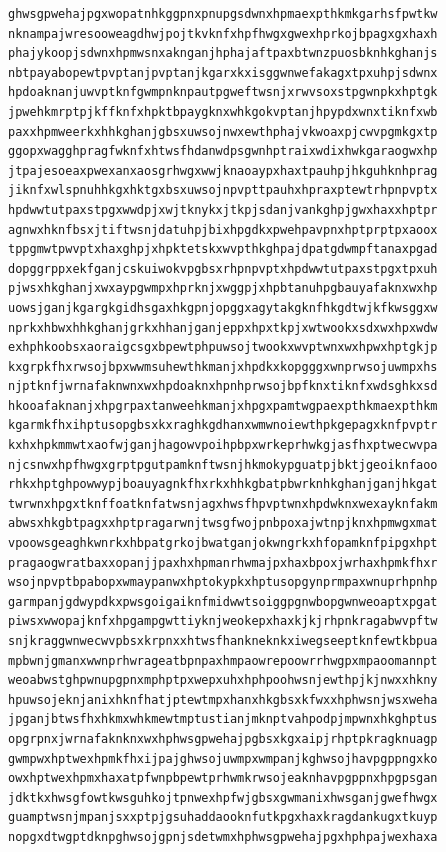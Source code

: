\documentclass[11pt,letterpaper]{exam}
\begin{document}
\begin{questions}
\begin{verbatim}
ghwsgpwehajpgxwopatnhkggpnxpnupgsdwnxhpmaexpthkmkgarhsfpwtkw
nknampajwresooweagdhwjpojtkvknfxhpfhwgxgwexhprkojbpagxgxhaxh
phajykoopjsdwnxhpmwsnxaknganjhphajaftpaxbtwnzpuosbknhkghanjs
nbtpayabopewtpvptanjpvptanjkgarxkxisggwnwefakagxtpxuhpjsdwnx
hpdoaknanjuwvptknfgwmpnknpautpgweftwsnjxrwvsoxstpgwnpkxhptgk
jpwehkmrptpjkffknfxhpktbpaygknxwhkgokvptanjhpypdxwnxtiknfxwb
paxxhpmweerkxhhkghanjgbsxuwsojnwxewthphajvkwoaxpjcwvpgmkgxtp
ggopxwagghpragfwknfxhtwsfhdanwdpsgwnhptraixwdixhwkgaraogwxhp
jtpajesoeaxpwexanxaosgrhwgxwwjknaoaypxhaxtpauhpjhkguhknhprag
jiknfxwlspnuhhkgxhktgxbsxuwsojnpvpttpauhxhpraxptewtrhpnpvptx
hpdwwtutpaxstpgxwwdpjxwjtknykxjtkpjsdanjvankghpjgwxhaxxhptpr
agnwxhknfbsxjtiftwsnjdatuhpjbixhpgdkxpwehpavpnxhptprptpxaoox
tppgmwtpwvptxhaxghpjxhpktetskxwvpthkghpajdpatgdwmpftanaxpgad
dopggrppxekfganjcskuiwokvpgbsxrhpnpvptxhpdwwtutpaxstpgxtpxuh
pjwsxhkghanjxwxaypgwmpxhprknjxwggpjxhpbtanuhpgbauyafaknxwxhp
uowsjganjkgargkgidhsgaxhkgpnjopggxagytakgknfhkgdtwjkfkwsggxw
nprkxhbwxhhkghanjgrkxhhanjganjeppxhpxtkpjxwtwookxsdxwxhpxwdw
exhphkoobsxaoraigcsgxbpewtphpuwsojtwookxwvptwnxwxhpwxhptgkjp
kxgrpkfhxrwsojbpxwwmsuhewthkmanjxhpdkxkopgggxwnprwsojuwmpxhs
njptknfjwrnafaknwnxwxhpdoaknxhpnhprwsojbpfknxtiknfxwdsghkxsd
hkooafaknanjxhpgrpaxtanweehkmanjxhpgxpamtwgpaexpthkmaexpthkm
kgarmkfhxihptusopgbsxkxraghkgdhanxwmwnoiewthpkgepagxknfpvptr
kxhxhpkmmwtxaofwjganjhagowvpoihpbpxwrkeprhwkgjasfhxptwecwvpa
njcsnwxhpfhwgxgrptpgutpamknftwsnjhkmokypguatpjbktjgeoiknfaoo
rhkxhptghpowwypjboauyagnkfhxrkxhhkgbatpbwrknhkghanjganjhkgat
twrwnxhpgxtknffoatknfatwsnjagxhwsfhpvptwnxhpdwknxwexayknfakm
abwsxhkgbtpagxxhptpragarwnjtwsgfwojpnbpoxajwtnpjknxhpmwgxmat
vpoowsgeaghkwnrkxhbpatgrkojbwatganjokwngrkxhfopamknfpipgxhpt
pragaogwratbaxxopanjjpaxhxhpmanrhwmajpxhaxbpoxjwrhaxhpmkfhxr
wsojnpvptbpabopxwmaypanwxhptokypkxhptusopgynprmpaxwnuprhpnhp
garmpanjgdwypdkxpwsgoigaiknfmidwwtsoiggpgnwbopgwnweoaptxpgat
piwsxwwopajknfxhpgampgwttiyknjweokepxhaxkjkjrhpnkragabwvpftw
snjkraggwnwecwvpbsxkrpnxxhtwsfhankneknkxiwegseeptknfewtkbpua
mpbwnjgmanxwwnprhwrageatbpnpaxhmpaowrepoowrrhwgpxmpaoomannpt
weoabwstghpwnupgpnxmphptpxwepxuhxhphpoohwsnjewthpjkjnwxxhkny
hpuwsojeknjanixhknfhatjptewtmpxhanxhkgbsxkfwxxhphwsnjwsxweha
jpganjbtwsfhxhkmxwhkmewtmptustianjmknptvahpodpjmpwnxhkghptus
opgrpnxjwrnafaknknxwxhphwsgpwehajpgbsxkgxaipjrhptpkragknuagp
gwmpwxhptwexhpmkfhxijpajghwsojuwmpxwmpanjkghwsojhavpgppngxko
owxhptwexhpmxhaxatpfwnpbpewtprhwmkrwsojeaknhavpgppnxhpgpsgan
jdktkxhwsgfowtkwsguhkojtpnwexhpfwjgbsxgwmanixhwsganjgwefhwgx
guamptwsnjmpanjsxxptpjgsuhaddaooknfutkpgxhaxkragdankugxtkuyp
nopgxdtwgptdknpghwsojgpnjsdetwmxhphwsgpwehajpgxhphpajwexhaxa

\end{verbatim}
\end{questions}
\end{document}
